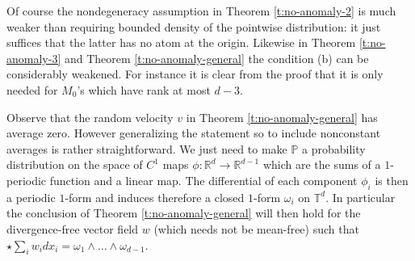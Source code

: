 \documentclass[11pt,reqno]{amsart}
\theoremstyle{definition}
\numberwithin{equation}{section}
\begin{document}
Of course the nondegeneracy assumption in Theorem \ref{t:no-anomaly-2} is much weaker than requiring bounded density of the pointwise distribution: it just suffices that the latter has no atom at the origin. Likewise in Theorem \ref{t:no-anomaly-3} and Theorem \ref{t:no-anomaly-general} the condition (b) can be considerably weakened. For instance it is clear from the proof that it is only needed for $M_0$'s which have rank at most $d-3$.

\medskip

Observe that the random velocity $v$ in Theorem \ref{t:no-anomaly-general} has average zero. However generalizing the statement so to include nonconstant averages is rather straightforward. We just need to make $\mathbb P$ a probability distribution on the space of $C^1$ maps $\phi: \mathbb R^d \to \mathbb R^{d-1}$ which are the sums of a $1$-periodic function and a linear map. The differential of each component $\phi_i$ is then a periodic $1$-form and induces therefore a closed $1$-form $\omega_i$ on $\mathbb T^d$. In particular the conclusion of Theorem \ref{t:no-anomaly-general} will then hold for the divergence-free vector field $w$ (which needs not be mean-free) such that $\star \sum_i w_i dx_i = \omega_1 \wedge \ldots \wedge \omega_{d-1}$. 



\end{document}
